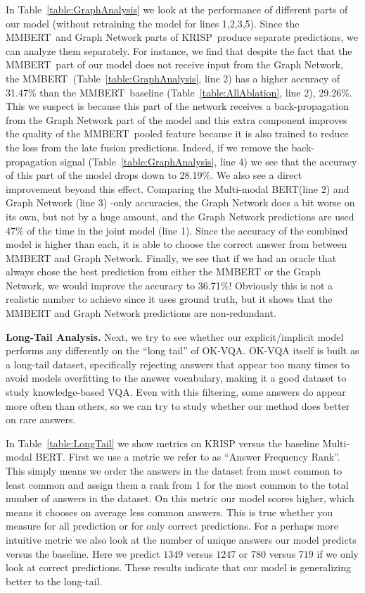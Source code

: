 \documentclass[final]{cvpr}
\providecommand{\ModelName}{KRISP\xspace}
\providecommand{\MMBERTBase}{Multi-modal BERT\xspace}
\providecommand{\MMBERTAbr}{MMBERT\xspace}
\providecommand{\myparagraph}[1]{\noindent\textbf{#1.}}
\providecommand{\sectionvspace}{\vspace{-0cm}}
\begin{document}
In Table~\ref{table:GraphAnalysis} we look at the performance of different parts of our model (without retraining the model for lines 1,2,3,5). Since the \MMBERTAbr~and Graph Network parts of \ModelName~produce separate predictions, we can analyze them separately. 
For instance, we find that despite the fact that the \MMBERTAbr~part of our model does not receive input from the Graph Network, the \MMBERTAbr~(Table~\ref{table:GraphAnalysis}, line 2) has a higher accuracy of 31.47\% than the \MMBERTAbr~baseline (Table~\ref{table:AllAblation}, line 2), 29.26\%. This we suspect is because this part of the network receives a back-propagation from the Graph Network part of the model and this extra component improves the quality of the \MMBERTAbr~pooled feature because it is also trained to reduce the loss from the late fusion predictions. Indeed, if we remove the back-propagation signal  
(Table~\ref{table:GraphAnalysis}, line 4) we see that the accuracy of this part of the model drops down to 28.19\%. We also see a direct improvement beyond this effect. Comparing the \MMBERTBase (line 2) and Graph Network (line 3) -only accuracies, the Graph Network does a bit worse on its own, but not by a huge amount, and the Graph Network predictions are used 47\% of the time in the joint model (line 1). Since the accuracy of the combined model is higher than each, it is able to choose the correct answer from between \MMBERTAbr and Graph Network. Finally, we see that if we had an oracle that always chose the best prediction from either the \MMBERTAbr or the Graph Network, we would improve the accuracy to 36.71\%! Obviously this is not a realistic number to achieve since it uses ground truth, but it shows that the \MMBERTAbr and Graph Network predictions are non-redundant.

\myparagraph{Long-Tail Analysis}
Next, we try to see whether our explicit/implicit model performs any differently on the ``long tail'' of OK-VQA. OK-VQA itself is built as a long-tail dataset, specifically rejecting answers that appear too many times to avoid models overfitting to the answer vocabulary, making it a good dataset to study knowledge-based VQA. Even with this filtering, some answers do appear more often than others, so we can try to study whether our method does better on rare answers. 

In Table~\ref{table:LongTail} we show metrics on \ModelName versus the baseline \MMBERTBase. First we use a metric we refer to as ``Answer Frequency Rank''. This simply means we order the answers in the dataset from most common to least common 
and assign them a rank from 1 for the most common to the total number of answers in the dataset. On this metric our model 
scores higher, which means it chooses on average less common answers. This is true whether you measure for all prediction or for only correct predictions.
For a perhaps more intuitive metric we also look at the number of unique answers our model predicts versus the baseline. Here we predict $1349$ versus $1247$ or $780$ versus $719$ if we only look at correct predictions.
These results indicate that our model is generalizing better to the long-tail.
\sectionvspace
\end{document}
